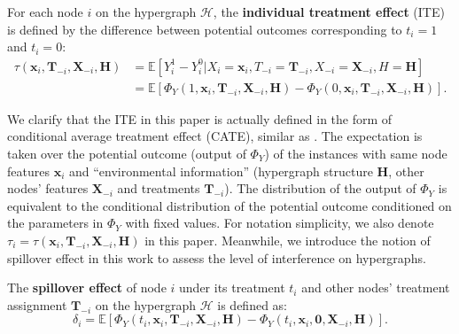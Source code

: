 {
\begin{definition}
For each node $i$ on the hypergraph $\mathcal{H}$, the \textbf{individual treatment effect} (ITE) %
is defined by the difference between potential outcomes corresponding to  $t_i=1$ and $t_i=0$:
\begin{equation}
\begin{split}
    \tau(\mathbf{x}_i,\mathbf{T}_{-i},\mathbf{X}_{-i},\mathbf{H}) &=\mathbb{E}[Y_i^1-Y_i^0|X_i=\mathbf{x}_i,T_{-i}=\mathbf{T}_{-i},X_{-i}=\mathbf{X}_{-i},H=\mathbf{H}] \\
    &= \mathbb{E}[\Phi_Y(1,\mathbf{x}_i,\mathbf{T}_{-i},\mathbf{X}_{-i},\mathbf{H}) - \Phi_Y(0,\mathbf{x}_i,\mathbf{T}_{-i},\mathbf{X}_{-i},\mathbf{H})].
    \label{eq:ite}
\end{split}
\end{equation}
\end{definition}
}
{We clarify that the ITE in this paper is actually defined in the form of conditional average treatment effect (CATE), similar as \cite{ma2021causal,guo2020learning}. The expectation is taken over the potential outcome (output of $\Phi_Y$) of the instances with same node features $\mathbf{x}_{i}$ and “environmental information” (hypergraph structure $\mathbf{H}$, other nodes’ features $\mathbf{X}_{-i}$ and treatments $\mathbf{T}_{-i}$). 
The distribution of the output of $\Phi_Y$ is equivalent to the conditional distribution of the potential outcome conditioned on the parameters in $\Phi_Y$ with fixed values. For notation simplicity, we also denote $\tau_i=\tau(\mathbf{x}_i,\mathbf{T}_{-i},\mathbf{X}_{-i},\mathbf{H})$ in this paper.
}
Meanwhile, we introduce the notion of spillover effect in this work to assess the level of interference on hypergraphs.
\begin{definition}
The \textbf{spillover effect} of node $i$ under its treatment  $t_i$ and other nodes' treatment assignment $\mathbf{T}_{-i}$ on the hypergraph $\mathcal{H}$ is defined as:
\begin{equation}
    \delta_i = \mathbb{E}[\Phi_Y(t_i,\mathbf{x}_i,\mathbf{T}_{-i},\mathbf{X}_{-i},\mathbf{H}) - \Phi_Y(t_i,\mathbf{x}_i,\mathbf{0},\mathbf{X}_{-i},\mathbf{H})].
    \label{eq:spillover}
\end{equation}
\end{definition}


